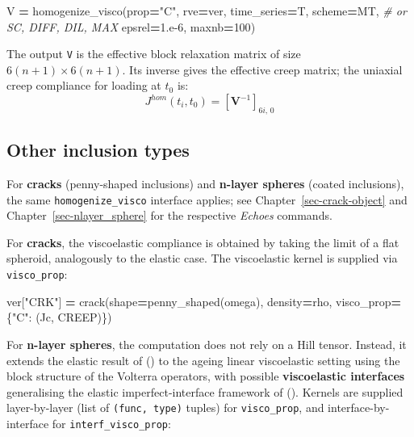 \documentclass[
  a4paper,
  numbers=noendperiod,
  DIV=12]{scrreprt}
\newenvironment{Shaded}{\begin{snugshade}}{\end{snugshade}}
\newcommand{\CommentTok}[1]{\textcolor[rgb]{0.56,0.35,0.01}{\textit{#1}}}
\newcommand{\DecValTok}[1]{\textcolor[rgb]{0.00,0.00,0.81}{#1}}
\newcommand{\FloatTok}[1]{\textcolor[rgb]{0.00,0.00,0.81}{#1}}
\newcommand{\NormalTok}[1]{#1}
\newcommand{\OperatorTok}[1]{\textcolor[rgb]{0.81,0.36,0.00}{\textbf{#1}}}
\newcommand{\StringTok}[1]{\textcolor[rgb]{0.31,0.60,0.02}{#1}}
\begin{document}
\begin{Shaded}
\begin{Highlighting}[]
\NormalTok{V }\OperatorTok{=}\NormalTok{ homogenize\_visco(prop}\OperatorTok{=}\StringTok{"C"}\NormalTok{, rve}\OperatorTok{=}\NormalTok{ver, time\_series}\OperatorTok{=}\NormalTok{T,}
\NormalTok{                     scheme}\OperatorTok{=}\NormalTok{MT,      }\CommentTok{\# or SC, DIFF, DIL, MAX}
\NormalTok{                     epsrel}\OperatorTok{=}\FloatTok{1.e{-}6}\NormalTok{, maxnb}\OperatorTok{=}\DecValTok{100}\NormalTok{)}
\end{Highlighting}
\end{Shaded}

The output \texttt{V} is the effective block relaxation matrix of size
\(6(n+1)\times 6(n+1)\). Its inverse gives the effective creep matrix;
the uniaxial creep compliance for loading at \(t_0\) is:
\[J^{hom}(t_i,t_0) = [\mathbf{V}^{-1}]_{6i,\,0}\]

\subsection{Other inclusion types}\label{other-inclusion-types}

For \textbf{cracks} (penny-shaped inclusions) and \textbf{n-layer
spheres} (coated inclusions), the same \texttt{homogenize\_visco}
interface applies; see Chapter~\ref{sec-crack-object} and
Chapter~\ref{sec-nlayer_sphere} for the respective \emph{Echoes}
commands.

For \textbf{cracks}, the viscoelastic compliance is obtained by taking
the limit of a flat spheroid, analogously to the elastic case. The
viscoelastic kernel is supplied via \texttt{visco\_prop}:

\begin{Shaded}
\begin{Highlighting}[]
\NormalTok{ver[}\StringTok{"CRK"}\NormalTok{] }\OperatorTok{=}\NormalTok{ crack(shape}\OperatorTok{=}\NormalTok{penny\_shaped(omega), density}\OperatorTok{=}\NormalTok{rho,}
\NormalTok{                   visco\_prop}\OperatorTok{=}\NormalTok{\{}\StringTok{"C"}\NormalTok{: (Jc, CREEP)\})}
\end{Highlighting}
\end{Shaded}

For \textbf{n-layer spheres}, the computation does not rely on a Hill
tensor. Instead, it extends the elastic result of
() to the ageing linear
viscoelastic setting using the block structure of the Volterra
operators, with possible \textbf{viscoelastic interfaces} generalising
the elastic imperfect-interface framework of
(). Kernels are
supplied layer-by-layer (list of \texttt{(func,\ type)} tuples) for
\texttt{visco\_prop}, and interface-by-interface for
\texttt{interf\_visco\_prop}:
\end{document}
